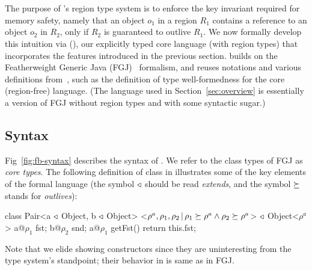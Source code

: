 \section{\fbname}
\label{sec:type-system}

The purpose of \name's region type system is to enforce the key
invariant required for memory safety, namely that an object $o_1$ in a
region $R_1$ contains a reference to an object $o_2$ in $R_2$, only if
$R_2$ is guaranteed to outlive $R_1$.  We now formally develop this
intuition via \fbname (\FB), our explicitly typed core language (with
region types) that incorporates the features introduced in the
previous section. \fbname builds on the Featherweight Generic Java
(FGJ)~\cite{fgj} formalism, and reuses notations and various
definitions from~\cite{fgj}, such as the definition of type
well-formedness for the core (region-free) language.  (The language
used in Section~\ref{sec:overview} is essentially a version of FGJ
without region types and with some syntactic sugar.)


\subsection{Syntax}
\label{sec:fb-syntax}

Fig~\ref{fig:fb-syntax} describes the syntax of \FB.
We refer to the class types of FGJ as \emph{core types}.
%
The following definition of  class in \FB illustrates some of
the key elements of the formal language (the symbol $\triangleleft$ should
be read \emph{extends}, and the symbol $\succeq$ stands for
\emph{outlives}):
\begin{codejava}[mathescape=true]
class Pair<a $\triangleleft$ Object, b $\triangleleft$ Object>
          <$\rho^a, \rho_1, \rho_2 \,|\, \rho_1 \succeq \rho^a \wedge \rho_2 \succeq \rho^a$> $\triangleleft$ Object<$\rho^a$> {
  a@$\rho_1$ fst; 
  b@$\rho_2$ snd;
  a@$\rho_1$ getFst() { return this.fst; }
}
\end{codejava}
Note that we elide showing constructors since they are uninteresting
from the type system's standpoint; their behavior in \FB is same as in
FGJ. 


